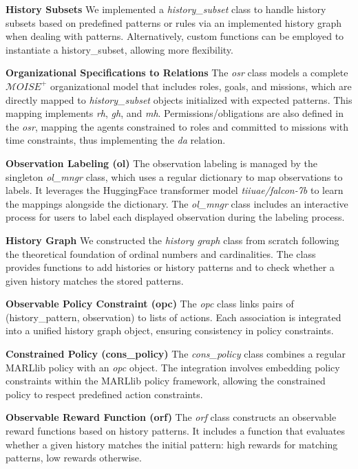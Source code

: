 \documentclass[conference]{IEEEtran}
\newcounter{relation}
\begin{document}
\textbf{History Subsets} \quad We implemented a \textit{history\_subset} class to handle history subsets based on predefined patterns or rules via an implemented history graph when dealing with patterns. Alternatively, custom functions can be employed to instantiate a history\_subset, allowing more flexibility.

\textbf{Organizational Specifications to Relations} \quad The \textit{osr} class models a complete $\mathcal{M}OISE^+$ organizational model that includes roles, goals, and missions, which are directly mapped to \textit{history\_subset} objects initialized with expected patterns. This mapping implements \textit{rh}, \textit{gh}, and \textit{mh}. Permissions/obligations are also defined in the \textit{osr}, mapping the agents constrained to roles and committed to missions with time constraints, thus implementing the \textit{da} relation.

\textbf{Observation Labeling (ol)} \quad The observation labeling is managed by the singleton \textit{ol\_mngr} class, which uses a regular dictionary to map observations to labels. It leverages the HuggingFace transformer model \textit{tiiuae/falcon-7b} to learn the mappings alongside the dictionary. The \textit{ol\_mngr} class includes an interactive process for users to label each displayed observation during the labeling process. %

\textbf{History Graph} \quad We constructed the \textit{history graph} class from scratch following the theoretical foundation of ordinal numbers and cardinalities. The class provides functions to add histories or history patterns and to check whether a given history matches the stored patterns.

\textbf{Observable Policy Constraint (opc)} \quad The \textit{opc} class links pairs of (history\_pattern, observation) to lists of actions. Each association is integrated into a unified history graph object, ensuring consistency in policy constraints.

\textbf{Constrained Policy (cons\_policy)} \quad The \textit{cons\_policy} class combines a regular MARLlib policy with an \textit{opc} object. The integration involves embedding policy constraints within the MARLlib policy framework, allowing the constrained policy to respect predefined action constraints.

\textbf{Observable Reward Function (orf)} \quad The \textit{orf} class constructs an observable reward functions based on history patterns. It includes a function that evaluates whether a given history matches the initial pattern: high rewards for matching patterns, low rewards otherwise.
\end{document}
